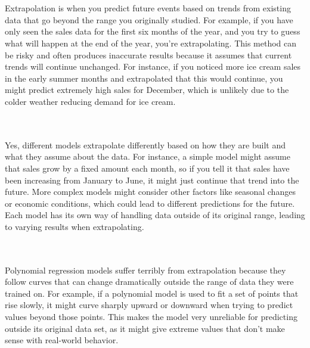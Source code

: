 \documentclass[12pt]{article}
\begin{document}
\begin{enumerate}

 \\ \\ 
Extrapolation is when you predict future events based on trends from existing data that go beyond the range you originally studied. For example, if you have only seen the sales data for the first six months of the year, and you try to guess what will happen at the end of the year, you're extrapolating. This method can be risky and often produces inaccurate results because it assumes that current trends will continue unchanged. For instance, if you noticed more ice cream sales in the early summer months and extrapolated that this would continue, you might predict extremely high sales for December, which is unlikely due to the colder weather reducing demand for ice cream.

 \\ \\ 
Yes, different models extrapolate differently based on how they are built and what they assume about the data. For instance, a simple model might assume that sales grow by a fixed amount each month, so if you tell it that sales have been increasing from January to June, it might just continue that trend into the future. More complex models might consider other factors like seasonal changes or economic conditions, which could lead to different predictions for the future. Each model has its own way of handling data outside of its original range, leading to varying results when extrapolating.

 \\ \\ 
Polynomial regression models suffer terribly from extrapolation because they follow curves that can change dramatically outside the range of data they were trained on. For example, if a polynomial model is used to fit a set of points that rise slowly, it might curve sharply upward or downward when trying to predict values beyond those points. This makes the model very unreliable for predicting outside its original data set, as it might give extreme values that don’t make sense with real-world behavior.


\end{enumerate}
\newpage
%
\end{document}
